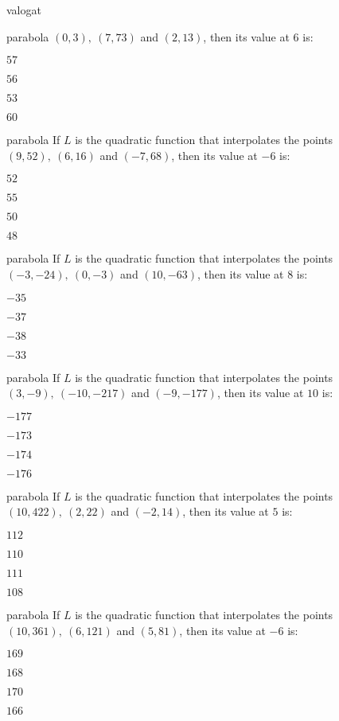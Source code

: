 \documentclass[12pt]{article}
\begin{document}
\begin{quiz}{valogat}
\begin{multi}{parabola}
$(0,3),\ (7,73)$ and $(2,13)$, then its value at $6$ is:
\item* $ 57 $
\item  $ 56 $
\item  $ 53 $
\item  $ 60 $
\end{multi}
\begin{multi}{parabola}
If $L$ is the quadratic function that interpolates the points
$(9,52),\ (6,16)$ and $(-7,68)$, then its value at $-6$ is:
\item* $ 52 $
\item  $ 55 $
\item  $ 50 $
\item  $ 48 $
\end{multi}
\begin{multi}{parabola}
If $L$ is the quadratic function that interpolates the points
$(-3,-24),\ (0,-3)$ and $(10,-63)$, then its value at $8$ is:
\item* $ -35 $
\item  $ -37 $
\item  $ -38 $
\item  $ -33 $
\end{multi}
\begin{multi}{parabola}
If $L$ is the quadratic function that interpolates the points
$(3,-9),\ (-10,-217)$ and $(-9,-177)$, then its value at $10$ is:
\item* $ -177 $
\item  $ -173 $
\item  $ -174 $
\item  $ -176 $
\end{multi}
\begin{multi}{parabola}
If $L$ is the quadratic function that interpolates the points
$(10,422),\ (2,22)$ and $(-2,14)$, then its value at $5$ is:
\item* $ 112 $
\item  $ 110 $
\item  $ 111 $
\item  $ 108 $
\end{multi}
\begin{multi}{parabola}
If $L$ is the quadratic function that interpolates the points
$(10,361),\ (6,121)$ and $(5,81)$, then its value at $-6$ is:
\item* $ 169 $
\item  $ 168 $
\item  $ 170 $
\item  $ 166 $
\end{multi}

\end{quiz}
\end{document}

